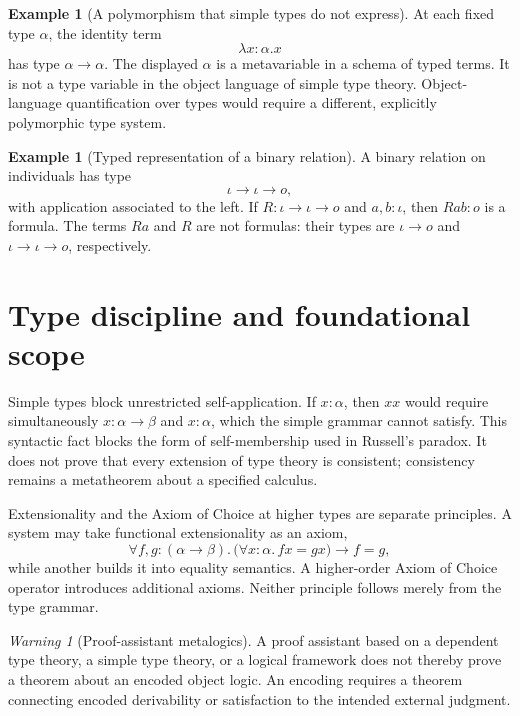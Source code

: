 \documentclass[11pt,oneside,openany]{book}
\theoremstyle{definition}
\newtheorem{example}[definition]{Example}
\theoremstyle{plain}
\theoremstyle{remark}
\newtheorem{warning}[definition]{Warning}
\begin{document}
\begin{example}[A polymorphism that simple types do not express]
At each fixed type \(\alpha\), the identity term
\[
  \lambda x{:}\alpha.x
\]
has type \(\alpha\to\alpha\).  The displayed \(\alpha\) is a metavariable in a
schema of typed terms.  It is not a type variable in the object language of
simple type theory.  Object-language quantification over types would require a
different, explicitly polymorphic type system.
\end{example}

\begin{example}[Typed representation of a binary relation]
A binary relation on individuals has type
\[
  \iota\to\iota\to o,
\]
with application associated to the left.  If
\(R:\iota\to\iota\to o\) and \(a,b:\iota\), then \(Rab:o\) is a formula.
The terms \(Ra\) and \(R\) are not formulas: their types are
\(\iota\to o\) and \(\iota\to\iota\to o\), respectively.
\end{example}

\section{Type discipline and foundational scope}
\label{sec:simple-type-theory-03}

Simple types block unrestricted self-application.  If \(x:\alpha\), then
\(xx\) would require simultaneously \(x:\alpha\to\beta\) and \(x:\alpha\),
which the simple grammar cannot satisfy.  This syntactic fact blocks the form
of self-membership used in Russell's paradox.  It does not prove that every
extension of type theory is consistent; consistency remains a metatheorem
about a specified calculus.

Extensionality and the Axiom of Choice at higher types are separate principles.  A system
may take functional extensionality as an axiom,
\[
  \forall f,g{:}(\alpha\to\beta).\,
  \bigl(\forall x{:}\alpha.\,fx=gx\bigr)\to f=g,
\]
while another builds it into equality semantics.  A higher-order Axiom of Choice
operator introduces additional axioms.  Neither principle follows merely from
the type grammar.

\begin{warning}[Proof-assistant metalogics]
A proof assistant based on a dependent type theory, a simple type theory, or a
logical framework does not thereby prove a theorem about an encoded object
logic.  An encoding requires a theorem connecting encoded derivability or
satisfaction to the intended external judgment.
\end{warning}
\end{document}
